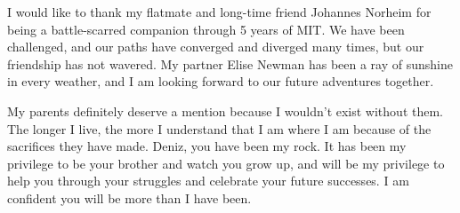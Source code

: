 I would like to thank my flatmate and long-time friend Johannes Norheim
for being a battle-scarred companion through 5 years of MIT. We have been challenged, and
our paths have converged and diverged many times, but our friendship has not wavered.
My partner Elise Newman has been a ray of sunshine in every weather,
and I am looking forward to our future adventures together.

My parents definitely deserve a mention because I wouldn't exist without them.
The longer I live, the more I understand that I am where I am because of the
sacrifices they have made.
Deniz, you have been my rock. It has been my privilege to be your brother and watch
you grow up, and will be my privilege to help you
through your struggles and celebrate your future successes.
I am confident you will be more than I have been.

